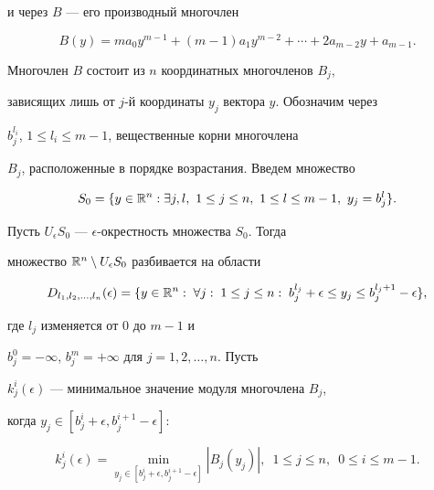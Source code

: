 и через $B$ --- его производный многочлен


$$


B(y)= m a_0y^{m-1} + (m-1)a_1y^{m-2} + \dotsb + 2a_{m-2}y + a_{m-1}.


$$


Многочлен $B$ состоит из $n$ координатных многочленов $B_j$,


зависящих лишь от $j$-й координаты $y_j$ вектора $y$. Обозначим через


$b_j^{l_i}$, $1\leq l_i \leq m-1$, вещественные корни многочлена 


$B_j$, расположенные в порядке возрастания. Введем множество


$$


S_0 =\{y\in {\Bbb R}^n: \exists j, l,\ 1\leq j \leq n, 


\ 1\leq l\leq m-1,\ y_j=b^l_j\}.


$$


Пусть $U_\epsilon S_0$ --- $\epsilon$-окрестность множества $S_0$. Тогда


множество ${\Bbb R}^n \setminus U_\epsilon S_0$ разбивается на области


$$


D_{l_1, l_2, \dotsc,l_n}(\epsilon)=\{y\in {\Bbb R}^n:\; \forall j: \;


1\leq j\leq n:\; b_j^{l_j}+\epsilon \leq y_j \leq b_j^{l_j+1}-\epsilon \},


$$


где $l_j$ изменяется от $0$ до $m-1$ и


$b_j^0=-\infty$, $b_j^m = +\infty$ для $j=1, 2, \dotsc, n$. Пусть


$k_j^i(\epsilon)$ --- минимальное значение модуля многочлена $B_j$,


когда $y_j\in [b_j^i +\epsilon, b_j^{i+1}-\epsilon]$:


$$


k_j^i(\epsilon) = \min\limits_{y_j\in [b_j^i+\epsilon, b_j^{i+1}-\epsilon]}


|B_j(y_j)|,\ \; 1\leq j\leq n,\ \; 0\leq i\leq m-1.


$$






